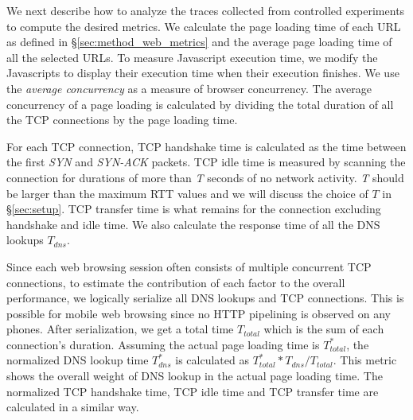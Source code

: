 
\label{sec:method_net_analysis}

We next describe how to analyze the traces collected from controlled
experiments to compute the desired metrics. We calculate the page 
loading time of each URL as defined in \S\ref{sec:method_web_metrics} 
and the average page loading time of all the selected URLs. To measure 
Javascript execution time, we modify the Javascripts to display their 
execution time when their execution finishes. We use the
{\em average concurrency} as a measure of browser concurrency. The
average concurrency of a page loading is calculated by dividing the 
total duration of all the TCP connections by the page loading time. 

For each TCP connection, TCP handshake time is calculated as the time
between the first \emph{SYN} and \emph{SYN-ACK} packets. TCP idle time 
is measured by scanning the connection for durations of more than 
\emph{T} seconds of no network activity. \emph{T} should be larger 
than the maximum RTT values and we will discuss the choice of $T$ in 
\S\ref{sec:setup}. TCP transfer time is what remains for the
connection excluding handshake and idle time. 
We also calculate the response time of all the DNS lookups $T_{dns}$. 


Since each web browsing session often consists of multiple concurrent
TCP connections, to estimate the contribution of each factor to the 
overall performance, we logically serialize all DNS lookups and TCP 
connections. This is possible for mobile web browsing since no HTTP 
pipelining is observed on any phones. After serialization, we get a 
total time $T_{total}$ which is the sum of each connection's duration. 
Assuming the actual page loading time is $T^{*}_{total}$, the
normalized DNS lookup time $T^{*}_{dns}$ is calculated as
$T^{*}_{total} * T_{dns} / T_{total}$. This metric shows the 
overall weight of DNS lookup in the actual page loading time. The
normalized TCP handshake time, TCP idle time and TCP transfer time 
are calculated in a similar way. 
	
